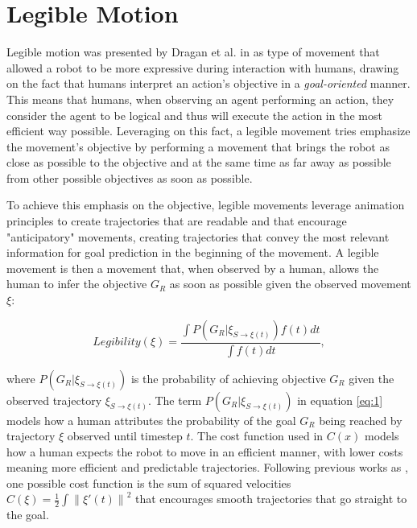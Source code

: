 \documentclass[letterpaper, 10 pt, conference]{ieeeconf}
\newcommand{\norm}[1]{\left\lVert#1\right\rVert}
\begin{document}

\section{Legible Motion}
\label{sec:legibility}

Legible motion was presented by Dragan et al. in \cite{dragan2013hri} as type of movement that allowed a robot to be more expressive during interaction with humans, drawing on the fact that humans interpret an action's objective in a \emph{goal-oriented} manner. \cite{csibra2007ap} This means that humans, when observing an agent performing an action, they consider the agent to be logical and thus will execute the action in the most efficient way possible. Leveraging on this fact, a legible movement tries emphasize the movement's objective by performing a movement that brings the robot as close as possible to the objective and at the same time as far away as possible from other possible objectives as soon as possible.

To achieve this emphasis on the objective, legible movements leverage animation principles to create trajectories that are readable\cite{takayama2011hri} and that encourage "anticipatory"\cite{gielniak2013ijrr} movements, creating trajectories that convey the most relevant information for goal prediction in the beginning of the movement. A legible movement is then a movement that, when observed by a human, allows the human to infer the objective $G_R$ as soon as possible given the observed movement $\xi$:

%
\begin{equation}
    \label{eq:1}
	Legibility(\xi) = \frac{\int P(G_R|\xi_{S\to\xi(t)})f(t)dt}{\int f(t) dt},
\end{equation}
%

where $P(G_R|\xi_{S\to\xi(t)})$ is the probability of achieving objective $G_R$ given the observed trajectory $\xi_{S\to \xi(t)}$. The term $P(G_R|\xi_{S\to\xi(t)})$ in equation \ref{eq:1} models how a human attributes the probability of the goal $G_R$ being reached by trajectory $\xi$ observed until timestep $t$.\cite{dragan2013hri} The cost function used in $C(x)$ models how a human expects the robot to move in an efficient manner, with lower costs meaning more efficient and predictable trajectories. Following previous works as \cite{dragan2013generating}, one possible cost function is the sum of squared velocities $C(\xi) = \frac{1}{2} \int{\norm{\xi'(t)}^2}$ that encourages smooth trajectories that go straight to the goal.
\end{document}
